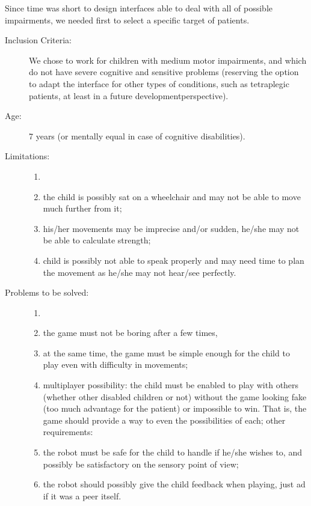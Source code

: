\documentclass[a4paper,twoside]{book}
\begin{document}
\beforelist Since time was short to design interfaces able to deal with all of possible impairments, we needed first to select a specific target of patients.
\begin{description}
\item[Inclusion Criteria:] We chose to work for children with medium motor impairments, and which do not have severe cognitive and sensitive problems (reserving the option to adapt the interface for other types of conditions, such as tetraplegic patients, at least in a future development\textendash perspective).
\item[Age:] 7 years (or mentally equal in case of cognitive disabilities).
\item[Limitations:]
  \begin{enumerate}
    \item[]
    \item the child is possibly sat on a wheelchair and may not be able to move much further from it;
    \item his/her movements may be imprecise and/or sudden, he/she may not be able to calculate strength;
    \item child is possibly not able to speak properly and may need time to plan the movement as he/she may not hear/see perfectly.
  \end{enumerate}
\item[Problems to be solved:]
  \begin{enumerate}
    \item[]
    \item the game must not be boring after a few times,
    \item at the same time, the game must be simple enough for the child to play even with difficulty in movements;
    \item multi\textendash player possibility: the child must be enabled to play with others (whether other disabled children or not) without the game looking fake (too much advantage for the patient) or impossible to win. That is, the game should provide a way to even the possibilities of each;  
    other requirements:
    \item the robot must be safe for the child to handle if he/she wishes to, and possibly be satisfactory on the sensory point of view;
    \item the robot should possibly give the child feedback when playing, just ad if it was a peer itself.
  \end{enumerate}
\end{description}
\afterlist*
\end{document}
